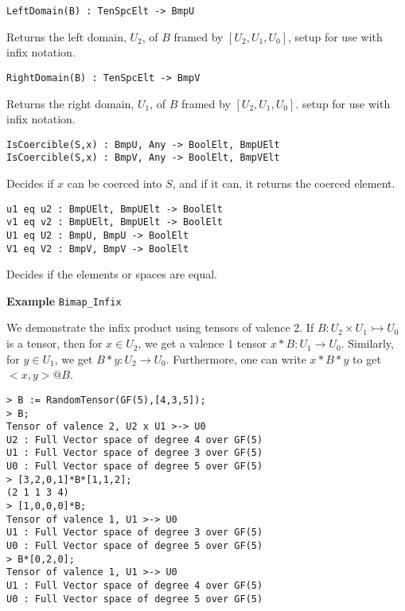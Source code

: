 \color{blue}
{\small \begin{verbatim}
LeftDomain(B) : TenSpcElt -> BmpU
\end{verbatim} }
\color{black}

Returns the left domain, $U_2$, of $B$ framed by $[U_2,U_1,U_0]$, 
setup for use with infix notation.

\color{blue}
{\small \begin{verbatim}
RightDomain(B) : TenSpcElt -> BmpV
\end{verbatim} }
\color{black}

Returns the right domain, $U_1$, of $B$  framed by $[U_2,U_1,U_0]$. 
setup for use with infix notation.

\color{blue}
{\small \begin{verbatim}
IsCoercible(S,x) : BmpU, Any -> BoolElt, BmpUElt
IsCoercible(S,x) : BmpV, Any -> BoolElt, BmpVElt
\end{verbatim} }
\color{black}

Decides if $x$ can be coerced into $S$, and if it can, it returns the coerced 
element.

\color{blue}
{\small \begin{verbatim}
u1 eq u2 : BmpUElt, BmpUElt -> BoolElt
v1 eq v2 : BmpUElt, BmpUElt -> BoolElt
U1 eq U2 : BmpU, BmpU -> BoolElt
V1 eq V2 : BmpV, BmpV -> BoolElt
\end{verbatim} }
\color{black}

Decides if the elements or spaces are equal.

\begin{framed} {\bf Example} {\tt Bimap\_Infix}\\
{\small We demonstrate the infix product using tensors of valence 2. 
If $B : U_2\times U_1\rightarrowtail U_0$ is a tensor, then for $x\in U_2$, we get a valence 1 tensor $x*B : U_1\rightarrow U_0$.
Similarly, for $y\in U_1$, we get $B*y : U_2\rightarrow U_0$. Furthermore, one can write $x*B*y$ to get $<x,y> @B$.
\begin{lstlisting}[frame=single,basicstyle=\ttfamily\color{black!30!
teal},backgroundcolor=\color{white!70!gray}]
> B := RandomTensor(GF(5),[4,3,5]);
> B;
Tensor of valence 2, U2 x U1 >-> U0
U2 : Full Vector space of degree 4 over GF(5)
U1 : Full Vector space of degree 3 over GF(5)
U0 : Full Vector space of degree 5 over GF(5)
> [3,2,0,1]*B*[1,1,2];
(2 1 1 3 4)
> [1,0,0,0]*B;
Tensor of valence 1, U1 >-> U0
U1 : Full Vector space of degree 3 over GF(5)
U0 : Full Vector space of degree 5 over GF(5)
> B*[0,2,0];
Tensor of valence 1, U1 >-> U0
U1 : Full Vector space of degree 4 over GF(5)
U0 : Full Vector space of degree 5 over GF(5)
\end{lstlisting} }
\end{framed}

